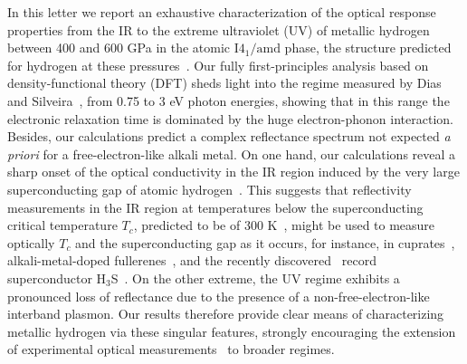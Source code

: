 \documentclass[%
 reprint,
superscriptaddress,
 amsmath,amssymb,
 aps,
prb,
floatfix,
]{revtex4-1}
\begin{document}
In this letter we report an exhaustive characterization of the optical
response properties from the IR to 
the extreme ultraviolet (UV) of metallic hydrogen between 400 and 600 GPa
in the atomic $\mathrm{I4_1/amd}$ phase, the structure predicted for hydrogen at these 
pressures~\cite{PhysRevLett.112.165501,PhysRevLett.106.165302}.
Our fully first-principles analysis based on density-functional
theory (DFT) sheds light into the regime measured by Dias and Silveira~\cite{Diaseaal1579}, 
from 0.75 to 3 eV photon energies,
showing that in this range the electronic relaxation time is dominated 
by the huge electron-phonon interaction.
Besides, our calculations predict a complex reflectance
spectrum not expected \emph{a priori} for a 
free-electron-like alkali metal.
On one hand, our calculations reveal a sharp onset of the optical conductivity in the IR region
induced by the very large superconducting gap
of atomic hydrogen~\cite{PhysRevB.93.174308}.
This suggests that reflectivity measurements in the IR region
at temperatures below the superconducting
critical temperature $T_c$, predicted to be of 300 K~\cite{PhysRevB.93.174308},
might be used to measure optically $T_c$ and the 
superconducting gap as it occurs, for instance, in 
cuprates~\cite{PhysRevLett.59.1958}, alkali-metal-doped 
fullerenes~\cite{Rotter1992}, and the recently discovered~\cite{Drozdov2015} 
record superconductor H$_3$S~\cite{Capitani2017}. 
On the other extreme, the UV regime 
exhibits a pronounced loss of reflectance due to 
the presence of a non-free-electron-like interband plasmon. 
Our results therefore provide clear means of characterizing metallic hydrogen 
via these singular features, strongly encouraging the extension of experimental 
optical measurements~\cite{Diaseaal1579} to broader regimes.
\end{document}
